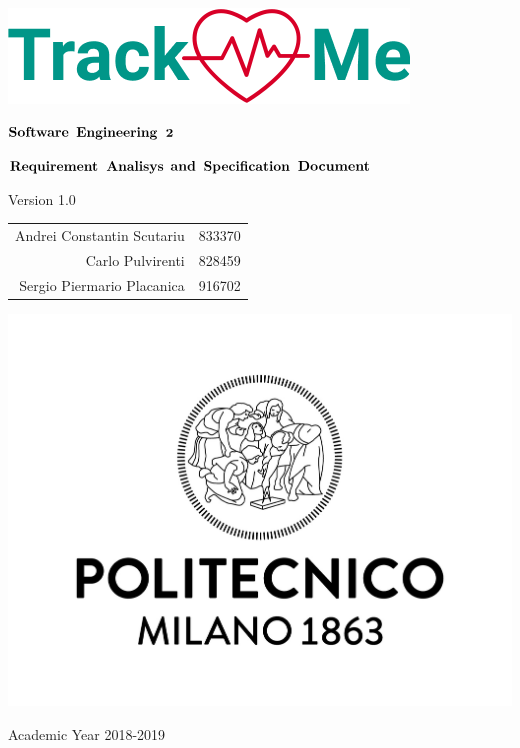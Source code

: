 \documentclass{article}
\author{
\and
\and
}
\date{}
\title{}
\begin{document}

\thispagestyle{empty} %
\begin{center}
	\includegraphics[scale=0.8]{images/mockup/logo2.png}

	

	\vspace{3cm}

	\large $\bf \large Software$ $\bf Engineering$ $\bf 2$

	\vspace{3mm}

	\LARGE $\bf Requirement$  $\bf Analisys$ $\bf and$ $\bf Specification$ $\bf Document$

	\vspace{2mm}
	\small Version 1.0

	\vspace{1cm}

	\begin{tabular}{r|l}
		\large Andrei Constantin Scutariu & \large 833370\\
		\large Carlo Pulvirenti & \large 828459\\
		\large Sergio Piermario Placanica & \large 916702\\
	\end{tabular}

	\vspace{3cm}
	
	\includegraphics[scale=0.15]{images/logoPolimi.jpg}
	
	\vspace{3mm}
	Academic Year 2018-2019


	\end{center}
\end{document}
